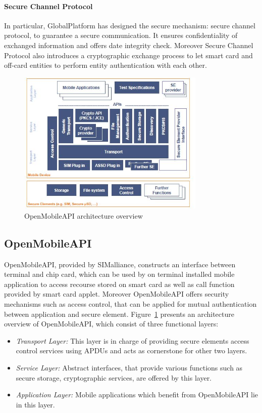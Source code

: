 \documentclass[]{llncs}
\begin{document}
\paragraph{Secure Channel Protocol}
In particular, GlobalPlatform has designed the secure mechanism: secure channel protocol, to guarantee a secure communication. It ensures confidentiality of exchanged information and offers date integrity check.  Moreover Secure Channel Protocol also introduces  a cryptographic exchange process to let smart card and off-card entities to perform entity authentication with each other. 
 \begin{figure}[!htbp]
	\centering
	\includegraphics[width=0.8\textwidth]{open-architecture.jpg}
		\caption[ ]{OpenMobileAPI architecture overview\cite{open}}
	\label{fig:open-architecture}
\end{figure}

\subsection{OpenMobileAPI}
OpenMobileAPI, provided by SIMalliance, constructs an interface between terminal and chip card, which can be used by on terminal installed mobile application to access recourse stored on smart card as well as call function provided by smart card applet. Moreover OpenMobileAPI offers security mechanisms such as access control, that can be applied for mutual authentication between application and secure element. Figure~\ref{fig:open-architecture} presents an architecture overview of OpenMobileAPI, which consist of three functional layers:
 \begin{itemize}
  \item \emph{Transport Layer:} This layer is in charge of providing secure elements access control services using APDUs and acts as cornerstone for other two layers.
  \item \emph{Service Layer:} Abstract interfaces, that provide various functions such as secure storage, cryptographic services, are offered by this layer.
  \item \emph{Application Layer:} Mobile applications which benefit from OpenMobileAPI lie in this layer.
\end{itemize}
\end{document}
